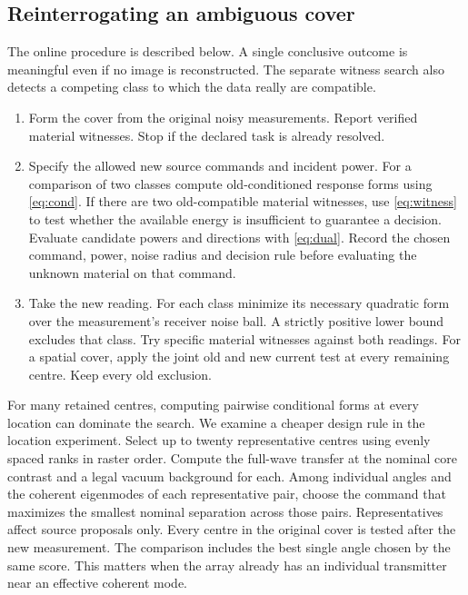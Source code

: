 \subsection{Reinterrogating an ambiguous cover}
The online procedure is described below. A single conclusive outcome is meaningful even if no image is reconstructed. The separate witness search also detects a competing class to which the data really are compatible.

\begin{enumerate}
\item Form the cover from the original noisy measurements. Report verified material witnesses. Stop if the declared task is already resolved.
\item Specify the allowed new source commands and incident power. For a comparison of two classes compute old-conditioned response forms using \eqref{eq:cond}. If there are two old-compatible material witnesses, use \eqref{eq:witness} to test whether the available energy is insufficient to guarantee a decision. Evaluate candidate powers and directions with \eqref{eq:dual}. Record the chosen command, power, noise radius and decision rule before evaluating the unknown material on that command.
\item Take the new reading. For each class minimize its necessary quadratic form over the measurement's receiver noise ball. A strictly positive lower bound excludes that class. Try specific material witnesses against both readings. For a spatial cover, apply the joint old and new current test at every remaining centre. Keep every old exclusion.
\end{enumerate}

For many retained centres, computing pairwise conditional forms at every location can dominate the search. We examine a cheaper design rule in the location experiment. Select up to twenty representative centres using evenly spaced ranks in raster order. Compute the full-wave transfer at the nominal core contrast and a legal vacuum background for each. Among individual angles and the coherent eigenmodes of each representative pair, choose the command that maximizes the smallest nominal separation across those pairs. Representatives affect source proposals only. Every centre in the original cover is tested after the new measurement. The comparison includes the best single angle chosen by the same score. This matters when the array already has an individual transmitter near an effective coherent mode.

